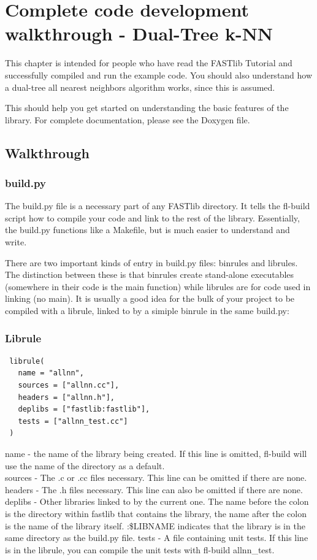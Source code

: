\documentclass[letter]{report}
\begin{document}
\chapter {Complete code development walkthrough - Dual-Tree k-NN}
This chapter is intended for people who have read the FASTlib Tutorial and successfully compiled and run the example code. You should also understand how a dual-tree all nearest neighbors algorithm works, since this is assumed. 

This should help you get started on understanding the basic features of the library. For complete documentation, please see the Doxygen file. 

\section{Walkthrough} 
\subsection{build.py} 
The build.py file is a necessary part of any FASTlib directory. It tells the fl-build script how to compile your code and link to the rest of the library. Essentially, the build.py functions like a Makefile, but is much easier to understand and write. 

There are two important kinds of entry in build.py files: binrules and librules. The distinction between these is that binrules create stand-alone executables (somewhere in their code is the main function) while librules are for code used in linking (no main). It is usually a good idea for the bulk of your project to be compiled with a librule, linked to by a simiple binrule in the same build.py: 

\subsection{Librule} 
\begin{verbatim}
 librule(
   name = "allnn",
   sources = ["allnn.cc"],
   headers = ["allnn.h"],
   deplibs = ["fastlib:fastlib"],
   tests = ["allnn_test.cc"]
 )
\end{verbatim}
name - the name of the library being created. If this line is omitted, fl-build will use the name of the directory as a default.\\ 
sources - The .c or .cc files necessary. This line can be omitted if there are none.\\ 
headers - The .h files necessary. This line can also be omitted if there are none.\\ 
deplibs - Other libraries linked to by the current one. The name before the colon is the directory within fastlib that contains the library, the name after the colon is the name of the library itself.  :\$LIBNAME indicates that the library is in the same directory as the build.py file. 
tests - A file containing unit tests. If this line is in the librule, you can compile the unit tests with fl-build allnn\_test. 
\end{document}
